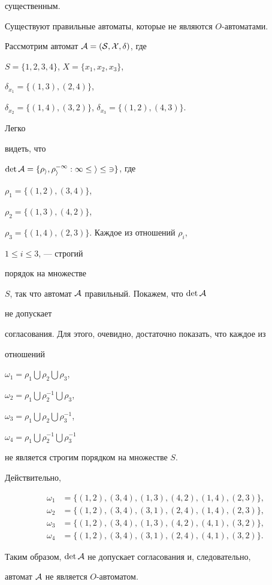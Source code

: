 существенным.





\begin{assrtnonum}


Существуют правильные автоматы, которые не являются $O$-автоматами.


\end{assrtnonum}





\begin{pf}


Рассмотрим автомат $\cal A=(S,X,\delta)$, где


$S=\{1,2,3,4\}$, $X=\{x_1,x_2,x_3\}$,


$\delta_{x_1}=\{(1,3),(2,4)\}$,


$\delta_{x_2}=\{(1,4),(3,2)\}$, $\delta_{x_3}=\{(1,2),(4,3)\}$.


Легко


видеть, что


$\det\cal A=\{\rho_i,\rho^{-1}_i:1\le i\le 3\}$, где


$\rho_1=\{(1,2),(3,4)\}$,


$\rho_2=\{(1,3),(4,2)\}$,


$\rho_3=\{(1,4),(2,3)\}$. Каждое из отношений $\rho_i$,


$1\le i\le 3$, --- строгий


порядок на множестве


$S$, так что автомат $\cal A$ правильный. Покажем, что $\det\cal A$


не допускает


согласования. Для этого, очевидно, достаточно показать, что каждое из


отношений


$\omega_1=\rho_1\bigcup\rho_2\bigcup\rho_3$,


$\omega_2=\rho_1\bigcup\rho_2^{-1}\bigcup\rho_3$,


$\omega_3=\rho_1\bigcup\rho_2\bigcup\rho_3^{-1}$,


$\omega_4=\rho_1\bigcup\rho_2^{-1}\bigcup\rho_3^{-1}$


не является строгим порядком на множестве $S$.


Действительно,


\begin{align*}


\omega_1&=\{(1,2),(3,4),(1,3),(4,2),(1,4),(2,3)\},\\


\omega_2&=\{(1,2),(3,4),(3,1),(2,4),(1,4),(2,3)\},\\


\omega_3&=\{(1,2),(3,4),(1,3),(4,2),(4,1),(3,2)\},\\


\omega_4&=\{(1,2),(3,4),(3,1),(2,4),(4,1),(3,2)\}.


\end{align*}


Таким образом, $\det\cal A$ не допускает согласования и, следовательно,


автомат $\cal A$ не является $O$-автоматом.


\end{pf}
